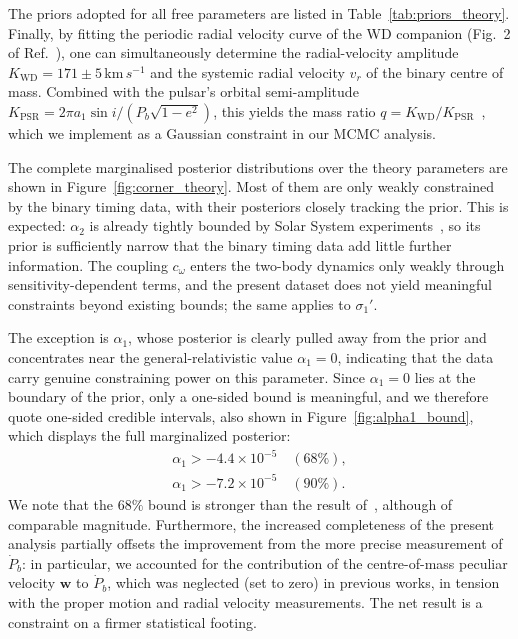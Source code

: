 \documentclass[
    floats,
    floatfix,
    amssymb,
    prd,
    twocolumn,
    superscriptaddress,
    nofootinbib,
    unicode,
    colorlinks=true,
    linktocpage=true
]{revtex4-2}
\begin{document}
The priors adopted for all free
parameters are listed in Table~\ref{tab:priors_theory}.
Finally, by fitting the periodic radial velocity curve of the WD companion 
(Fig.~2 of Ref.~\cite{Antoniadis:2012vy}), one can simultaneously determine the 
radial-velocity amplitude $K_\mathrm{WD}=171 \pm 5$\,km\,$s^{-1}$ and the systemic radial velocity $v_r$ 
of the binary centre of mass. Combined with the pulsar's orbital semi-amplitude 
$K_\mathrm{PSR} = 2\pi a_1 \sin i / (P_b \sqrt{1-e^2})$, this yields the mass ratio 
$q = K_\mathrm{WD}/K_\mathrm{PSR}$~\citep{Antoniadis:2012vy}, 
which we implement as a Gaussian constraint in our MCMC analysis.


The complete marginalised posterior distributions over the theory
parameters are shown in Figure~\ref{fig:corner_theory}. Most of them
are only weakly constrained by the binary timing data, with their 
posteriors closely tracking the prior. This is expected: 
$\alpha_2$ is already tightly bounded by Solar System 
experiments~\cite{Will:2014kxa,muller:2005sr}, so its prior is sufficiently narrow that 
the binary timing data add little further information. The coupling 
$c_\omega$ enters the two-body dynamics only weakly through 
sensitivity-dependent terms, and the present dataset does not yield 
meaningful constraints beyond existing bounds; the same applies to $\sigma_1'$. 

The exception is $\alpha_1$, whose posterior is clearly pulled away from the 
prior and concentrates near the general-relativistic value $\alpha_1 = 0$, 
indicating that the data carry genuine constraining power on this parameter. 
Since $\alpha_1 = 0$ lies at the boundary of the prior, only a one-sided bound 
is meaningful, and we therefore quote one-sided credible intervals, also shown in Figure~\ref{fig:alpha1_bound}, which displays the full marginalized posterior:
\begin{equation}
\begin{split}
    \alpha_1 > -4.4 \times 10^{-5} \quad (68\%), \\
    \alpha_1 > -7.2 \times 10^{-5} \quad (90\%).
    \end{split}
    \label{eq:alpha1_bound}
\end{equation}
We note that the $68\%$ bound is stronger than the result of~\citet{Gupta_2021}, 
although of comparable magnitude. Furthermore, the increased completeness of the 
present analysis partially offsets the improvement from the more precise measurement 
of $\dot{P}_b$: in particular, we accounted for the contribution of the 
centre-of-mass peculiar velocity $\mathbf{w}$ to $\dot{P}_b$, which was neglected 
(set to zero) in previous works, in tension with the proper motion and radial 
velocity measurements. The net result is a constraint on a firmer statistical 
footing.
\end{document}
